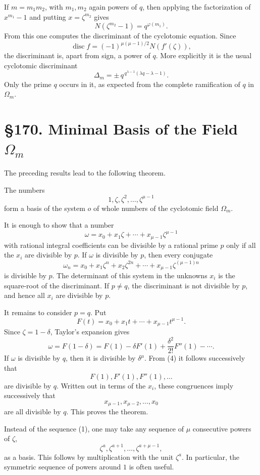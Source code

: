\documentclass[12pt,a4paper]{article}
\newcommand{\webersection}[2]{\clearpage\section*{\S #1. #2}}
\newcommand{\disc}{\operatorname{disc}}
\begin{document}
If \(m=m_1m_2\), with \(m_1,m_2\) again powers of \(q\), then applying the factorization of \(x^{m_1}-1\) and putting \(x=\zeta^{m_2}\) gives
\[
  N(\zeta^{m_2}-1)=q^{\varphi(m_1)}.
\tag{8}
\]
From this one computes the discriminant of the cyclotomic equation.  Since
\[
  \disc f=(-1)^{\mu(\mu-1)/2}N(f'(\zeta)),
\]
the discriminant is, apart from sign, a power of \(q\).  More explicitly it is the usual cyclotomic discriminant
\[
  \Delta_m=\pm\,q^{\,q^{\lambda-1}(\lambda q-\lambda-1)}.
\tag{9}
\]
Only the prime \(q\) occurs in it, as expected from the complete ramification of \(q\) in \(\Omega_m\).

\webersection{170}{Minimal Basis of the Field \(\Omega_m\)}

The preceding results lead to the following theorem.

The numbers
\[
  1,\zeta,\zeta^2,\ldots,\zeta^{\mu-1}
\tag{1}
\]
form a basis of the system \(o\) of whole numbers of the cyclotomic field \(\Omega_m\).

It is enough to show that a number
\[
  \omega=x_0+x_1\zeta+\cdots+x_{\mu-1}\zeta^{\mu-1}
\tag{2}
\]
with rational integral coefficients can be divisible by a rational prime \(p\) only if all the \(x_i\) are divisible by \(p\).  If \(\omega\) is divisible by \(p\), then every conjugate
\[
  \omega_n=x_0+x_1\zeta^n+x_2\zeta^{2n}+\cdots+x_{\mu-1}\zeta^{(\mu-1)n}
\tag{3}
\]
is divisible by \(p\).  The determinant of this system in the unknowns \(x_i\) is the square-root of the discriminant.  If \(p\ne q\), the discriminant is not divisible by \(p\), and hence all \(x_i\) are divisible by \(p\).

It remains to consider \(p=q\).  Put
\[
  F(t)=x_0+x_1t+\cdots+x_{\mu-1}t^{\mu-1}.
\]
Since \(\zeta=1-\delta\), Taylor's expansion gives
\[
  \omega=F(1-\delta)
       =F(1)-\delta F'(1)+\frac{\delta^2}{2!}F''(1)-\cdots.
\tag{4}
\]
If \(\omega\) is divisible by \(q\), then it is divisible by \(\delta^\mu\).  From (4) it follows successively that
\[
  F(1),F'(1),F''(1),\ldots
\]
are divisible by \(q\).  Written out in terms of the \(x_i\), these congruences imply successively that
\[
  x_{\mu-1},x_{\mu-2},\ldots,x_0
\]
are all divisible by \(q\).  This proves the theorem.

Instead of the sequence (1), one may take any sequence of \(\mu\) consecutive powers of \(\zeta\),
\[
  \zeta^a,\zeta^{a+1},\ldots,\zeta^{a+\mu-1},
\tag{5}
\]
as a basis.  This follows by multiplication with the unit \(\zeta^a\).  In particular, the symmetric sequence of powers around \(1\) is often useful.
\end{document}
